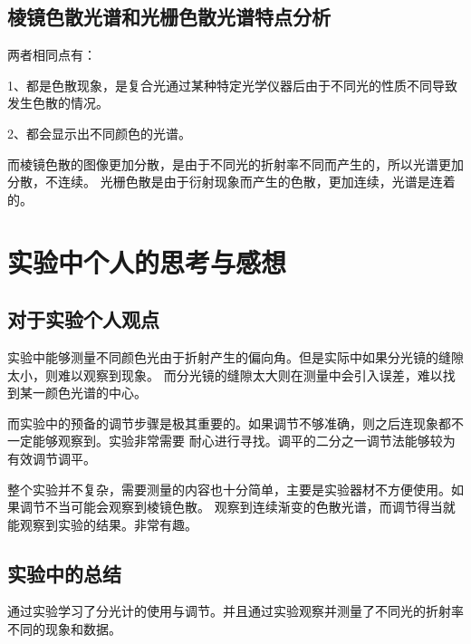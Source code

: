 \documentclass{ctexart}
\begin{document}
  \subsection{棱镜色散光谱和光栅色散光谱特点分析}
  两者相同点有：

  1、都是色散现象，是复合光通过某种特定光学仪器后由于不同光的性质不同导致发生色散的情况。

  2、都会显示出不同颜色的光谱。

  而棱镜色散的图像更加分散，是由于不同光的折射率不同而产生的，所以光谱更加分散，不连续。
  光栅色散是由于衍射现象而产生的色散，更加连续，光谱是连着的。
\newpage

\section{实验中个人的思考与感想}
  \subsection{对于实验个人观点}
  实验中能够测量不同颜色光由于折射产生的偏向角。但是实际中如果分光镜的缝隙太小，则难以观察到现象。
  而分光镜的缝隙太大则在测量中会引入误差，难以找到某一颜色光谱的中心。

  而实验中的预备的调节步骤是极其重要的。如果调节不够准确，则之后连现象都不一定能够观察到。实验非常需要
  耐心进行寻找。调平的二分之一调节法能够较为有效调节调平。

  整个实验并不复杂，需要测量的内容也十分简单，主要是实验器材不方便使用。如果调节不当可能会观察到棱镜色散。
  观察到连续渐变的色散光谱，而调节得当就能观察到实验的结果。非常有趣。

  \subsection{实验中的总结}
  通过实验学习了分光计的使用与调节。并且通过实验观察并测量了不同光的折射率不同的现象和数据。
\end{document}
